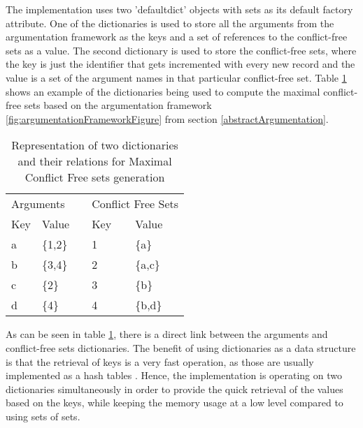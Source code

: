 The implementation uses two 'defaultdict' objects with sets as its default factory attribute. One of the dictionaries is used to store all the arguments from the argumentation framework as the keys and a set of references to the conflict-free sets as a value. The second dictionary is used to store the conflict-free sets, where the key is just the identifier that gets incremented with every new record and the value is a set of the argument names in that particular conflict-free set. Table \ref{table:dictsRepresentation} shows an example of the dictionaries being used to compute the maximal conflict-free sets based on the argumentation framework \ref{fig:argumentationFrameworkFigure} from section \ref{abstractArgumentation}.

\begin{table}[h]
	\centering
	\caption{Representation of two dictionaries and their relations for Maximal Conflict Free sets generation}
	\label{table:dictsRepresentation}
	\begin{tabular}{lllll}
		\multicolumn{2}{l}{Arguments}                            &                       & \multicolumn{2}{l}{Conflict Free Sets}                  \\ \cline{1-2} \cline{4-5} 
		\multicolumn{1}{|l|}{Key} & \multicolumn{1}{l|}{Value}   & \multicolumn{1}{l|}{} & \multicolumn{1}{l|}{Key} & \multicolumn{1}{l|}{Value}   \\ \cline{1-2} \cline{4-5} 
		\multicolumn{1}{|l|}{a}   & \multicolumn{1}{l|}{\{1,2\}} & \multicolumn{1}{l|}{} & \multicolumn{1}{l|}{1}   & \multicolumn{1}{l|}{\{a\}}   \\ \cline{1-2} \cline{4-5} 
		\multicolumn{1}{|l|}{b}   & \multicolumn{1}{l|}{\{3,4\}} & \multicolumn{1}{l|}{} & \multicolumn{1}{l|}{2}   & \multicolumn{1}{l|}{\{a,c\}} \\ \cline{1-2} \cline{4-5} 
		\multicolumn{1}{|l|}{c}   & \multicolumn{1}{l|}{\{2\}}   & \multicolumn{1}{l|}{} & \multicolumn{1}{l|}{3}   & \multicolumn{1}{l|}{\{b\}}   \\ \cline{1-2} \cline{4-5} 
		\multicolumn{1}{|l|}{d}   & \multicolumn{1}{l|}{\{4\}}   & \multicolumn{1}{l|}{} & \multicolumn{1}{l|}{4}   & \multicolumn{1}{l|}{\{b,d\}} \\ \cline{1-2} \cline{4-5} 
	\end{tabular}
\end{table}

As can be seen in table \ref{table:dictsRepresentation}, there is a direct link between the arguments and conflict-free sets dictionaries. The benefit of using dictionaries as a data structure is that the retrieval of keys is a very fast operation, as those are usually implemented as a hash tables \citep{pythonDictionary}. Hence, the implementation is operating on two dictionaries simultaneously in order to provide the quick retrieval of the values based on the keys, while keeping the memory usage at a low level compared to using sets of sets.

